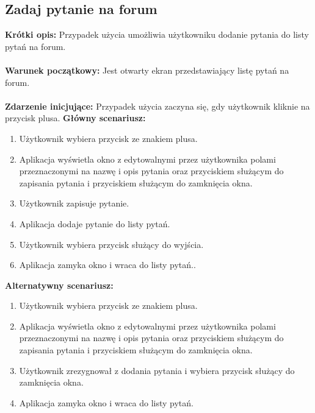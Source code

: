 \documentclass[10pt,a4paper]{report}
\begin{document}
\begin{adjustwidth}{2cm}{2cm}
\subsection{Zadaj pytanie na forum}
\begin{minipage}{1\linewidth}
\textbf{Krótki opis:} Przypadek użycia umożliwia użytkowniku dodanie pytania do listy pytań na forum.   \\ \\
\textbf{Warunek początkowy:} Jest otwarty ekran przedstawiający listę pytań na forum.  \\ \\
\textbf{Zdarzenie inicjujące:} Przypadek użycia zaczyna się, gdy użytkownik kliknie na przycisk plusa. 
\textbf{Główny scenariusz:} 
\begin{enumerate}
\setlength\itemsep{0.2cm}
    \item Użytkownik wybiera przycisk ze znakiem plusa. 
    \item Aplikacja wyświetla okno z edytowalnymi przez użytkownika polami przeznaczonymi na nazwę i opis pytania oraz przyciskiem służącym do zapisania pytania i przyciskiem służącym do zamknięcia okna.
    \item Użytkownik zapisuje pytanie.
    \item Aplikacja dodaje pytanie do listy pytań.
    \item Użytkownik wybiera przycisk służący do wyjścia.
    \item Aplikacja zamyka okno i wraca do listy pytań..
\end{enumerate}
\end{minipage}
\begin{minipage}{1\linewidth}
\textbf{Alternatywny scenariusz:} 
\begin{enumerate}
\setlength\itemsep{0.2cm}
    \item Użytkownik wybiera przycisk ze znakiem plusa.
    \item Aplikacja wyświetla okno z edytowalnymi przez użytkownika polami przeznaczonymi na nazwę i opis pytania oraz przyciskiem służącym do zapisania pytania i przyciskiem służącym do zamknięcia okna.
    \item Użytkownik zrezygnował z dodania pytania i wybiera przycisk służący do zamknięcia okna.
    \item Aplikacja zamyka okno i wraca do listy pytań.
\end{enumerate}
\end{minipage}

\end{adjustwidth}
\end{document}
